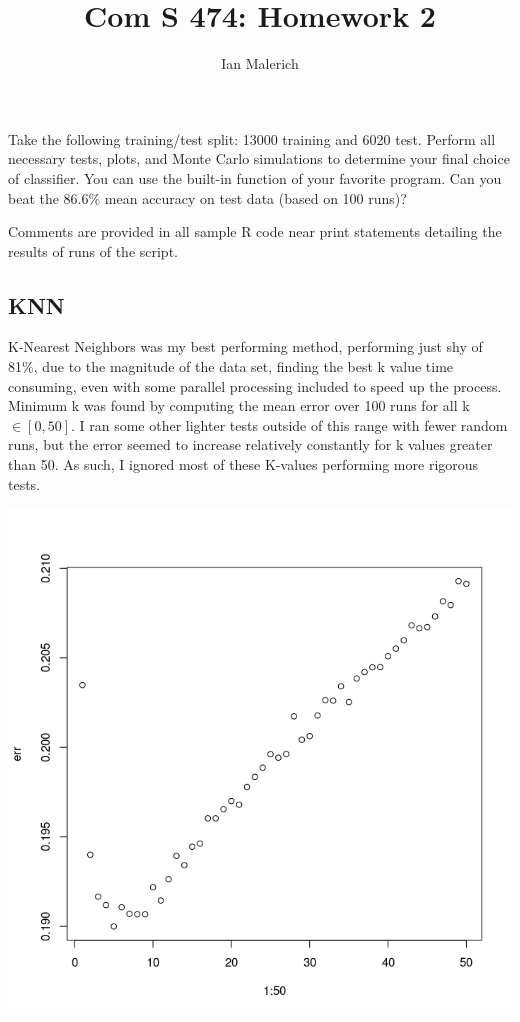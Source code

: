 \documentclass{jhwhw}
\author{Ian Malerich}
\title{Com S 474: Homework 2}
\begin{document}
\raggedright

\problem{}

    Take the following training/test split: 13000 training and 6020 test. Perform all
    necessary tests, plots, and Monte Carlo simulations to determine your final choice of classifier.
    You can use the built-in function of your favorite program. Can you beat the 86.6\% mean accuracy
    on test data (based on 100 runs)?

\solution

    Comments are provided in all sample R code near print statements detailing
    the results of runs of the script. \\

    \subsection*{KNN}
    K-Nearest Neighbors was my best performing method, performing just shy of 81\%,
    due to the magnitude of the data set, finding the best k value time consuming,
    even with some parallel processing included to speed up the process.
    Minimum k was found by computing the mean error over 100 runs for all k 
    $\in [0,50]$. I ran some other lighter tests outside of this range with
    fewer random runs, but the error seemed to increase relatively constantly for 
    k values greater than 50. As such, I ignored most of these K-values performing
    more rigorous tests.
    \begin{center}
	\includegraphics[scale=0.5]{mink}
    \end{center}
    \inputminted[linenos,frame=lines,framesep=2mm]{R}{knn.R}
\end{document}
